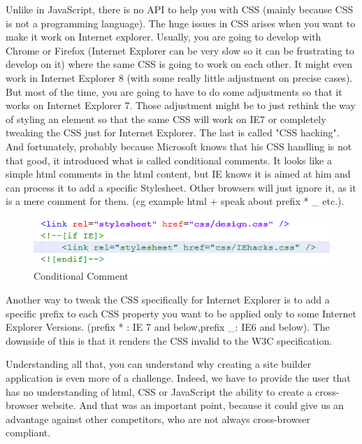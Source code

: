 Unlike in JavaScript, there is no API to help you with CSS (mainly because CSS is not a programming language). The huge issues in CSS arises when you want to make it work on Internet explorer. Usually, you are going to develop with Chrome or Firefox (Internet Explorer can be very slow so it can be frustrating to develop on it) where the same CSS is going to work on each other. It might even work in Internet Explorer 8 (with some really little adjustment on precise cases). But most of the time, you are going to have to do some adjustments so that it works on Internet Explorer 7. Those adjustment might be to just rethink the way of styling an element so that the same CSS will work on IE7 or completely tweaking the CSS just for Internet Explorer.
The last is called "CSS hacking". And fortunately, probably because Microsoft knows that his CSS handling is not that good, it introduced what is called conditional comments. It looks like a simple html comments in the html content, but IE knows it is aimed at him and can process it to add a specific Stylesheet. Other browsers will just ignore it, as it is a mere comment for them. (cg example html + speak about prefix * \_ etc.). 
\begin{figure}[!r]
\centering
\includegraphics[width=.55\textwidth]{img/comments.png}
\caption{Conditional Comment}
\label{figure:conditional comment}
\end{figure}
Another way to tweak the CSS specifically for Internet Explorer is to add a specific prefix to each CSS property you want to be applied only to some Internet Explorer Versions. (prefix * : IE 7 and below,prefix \_: IE6 and below). The downside of this is that it renders the CSS invalid to the W3C specification.

Understanding all that, you can understand why creating a site builder application is even more of a challenge. Indeed, we have to provide the user that has no understanding of html, CSS or JavaScript the ability to create a cross-browser website. And that was an important point, because it could give us an advantage against other competitors, who are not always cross-browser compliant.



